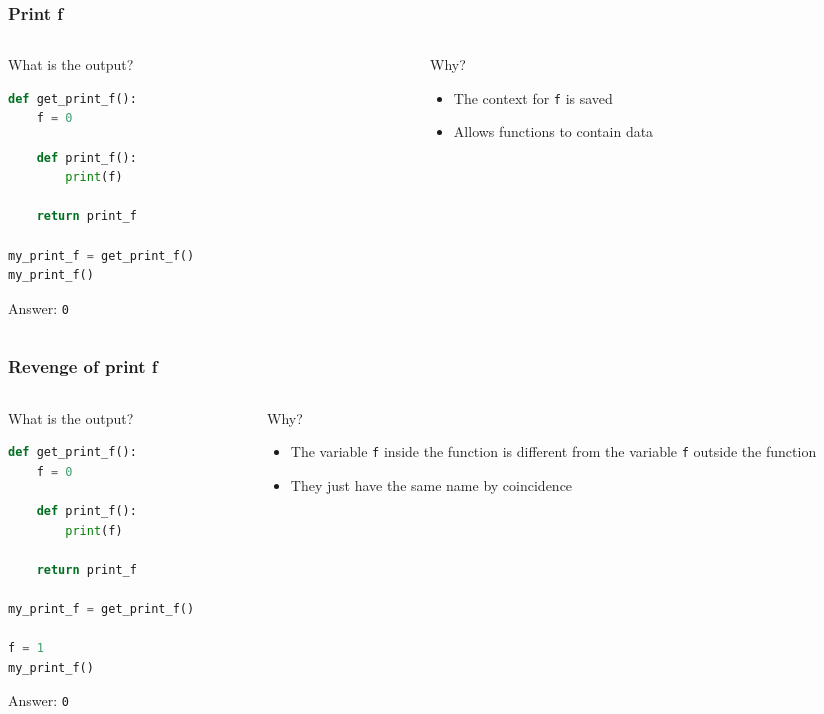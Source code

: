 \documentclass[aspectratio=169,hyperref={bookmarks=false,urlcolor=blue,colorlinks=true},10pt]{beamer}
\begin{document}
\begin{frame}[fragile]
  \frametitle{Print f}

  \begin{columns}[t]
    \begin{column}{0.45\textwidth}
      What is the output?

      \begin{lstlisting}[language=Python]
def get_print_f():
    f = 0

    def print_f():
        print(f)

    return print_f

my_print_f = get_print_f()
my_print_f()
      \end{lstlisting}

      \pause

      Answer: \texttt{0}
    \end{column}
    \begin{column}{0.45\textwidth}
      Why?

      \pause

      \begin{itemize}
      \item The context for \texttt{f} is saved
      \item Allows functions to contain data
      \end{itemize}
    \end{column}
  \end{columns}
\end{frame}

\begin{frame}[fragile]
  \frametitle{Revenge of print f}

  \begin{columns}[t]
    \begin{column}{0.45\textwidth}
      What is the output?

      \begin{lstlisting}[language=Python]
def get_print_f():
    f = 0

    def print_f():
        print(f)

    return print_f

my_print_f = get_print_f()

f = 1
my_print_f()
      \end{lstlisting}

      \pause

      Answer: \texttt{0}
    \end{column}
    \begin{column}{0.45\textwidth}
      Why?

      \pause

      \begin{itemize}
      \item The variable \texttt{f} inside the function is different from the variable \texttt{f}
        outside the function
      \item They just have the same name by coincidence
      \end{itemize}
    \end{column}
  \end{columns}
\end{frame}
\end{document}
